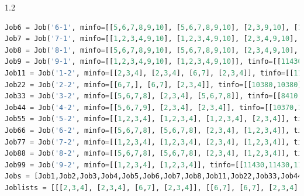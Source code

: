\documentclass{whutmod}
\begin{document}
\begin{spacing}{1.2}
\begin{lstlisting}[language=python]
Job6 = Job('6-1', minfo=[[5,6,7,8,9,10], [5,6,7,8,9,10], [2,3,9,10], [1,2,3,4,9,10]], tinfo=[[6480,6480,6480,6480,6480,6480], [5735,5735,5735,5735,5735,5735], [10585,10585,10585,10585], [4125,4125,4125,4125,4125,4125]], productType='F')
Job7 = Job('7-1', minfo=[[1,2,3,4,9,10], [1,2,3,4,9,10], [2,3,4,9,10], [1,2,3,4,9,10]], tinfo=[[9405,9405,9405,9405,9405,9405], [11665,11665,11665,11665,11665,11655], [18910,18910,18910,18910,18910], [5375,5375,5375,5375,5355,5355]], productType='G')
Job8 = Job('8-1', minfo=[[5,6,7,8,9,10], [5,6,7,8,9,10], [2,3,4,9,10], [1,2,3,4,9,10]], tinfo=[[4975,4975,4975,4975,4975,4975], [4975,4975,4975,4975,4975,4975], [7395,7395,7395,7395,7396], [2875,2875,2875,2875,2875,2875]], productType='H')
Job9 = Job('9-1', minfo=[[1,2,3,4,9,10], [1,2,3,4,9,10]], tinfo=[[11430,11430,11430,11430,11430,11430], [9155,9155,9155,9155,9155,9155]], productType='I')
Job11 = Job('1-2', minfo=[[2,3,4], [2,3,4], [6,7], [2,3,4]], tinfo=[[11553,11553,11553], [5769,5769,5769], [4657,4657], [2616,2616,2616]], productType='A')
Job22 = Job('2-2', minfo=[[6,7,], [6,7], [2,3,4]], tinfo=[[10380,10380], [14910,14910], [4905,4905,4905]], productType='B')
Job33 = Job('3-2', minfo=[[5,6,7,8], [2,3,4], [5,6,7,8]], tinfo=[[8410,8410,8410,8410], [15855,15855,15855], [3902,3902,3902,3902]], productType='C')
Job44 = Job('4-2', minfo=[[5,6,7,9], [2,3,4], [2,3,4]], tinfo=[[10370,10370,10370,10370], [15000,15000,15000], [9386,9386,9386]], productType='D')
Job55 = Job('5-2', minfo=[[1,2,3,4], [1,2,3,4], [1,2,3,4], [2,3,4]], tinfo=[[11655,11655,11655,11655], [7043,7043,7043,7043], [14355,14355,14355,14355], [23410,23410,23410]], productType='E')
Job66 = Job('6-2', minfo=[[5,6,7,8], [5,6,7,8], [2,3,4], [1,2,3,4]], tinfo=[[6480,6480,6480,6480], [5735,5735,5735,5735], [10585,10585,10585], [4125,4125,4125,4125]], productType='F')
Job77 = Job('7-2', minfo=[[1,2,3,4], [1,2,3,4], [2,3,4], [1,2,3,4]], tinfo=[[9405,9405,9405,9405], [11665,11665,11665,11665], [18910,18910,18910], [5375,5375,5375,5375]], productType='G')
Job88 = Job('8-2', minfo=[[5,6,7,8], [5,6,7,8], [2,3,4], [1,2,3,4]], tinfo=[[4975,4975,4975,4975], [4975,4975,4975,4975], [7395,7395,7395], [2875,2875,2875,2875]], productType='H')
Job99 = Job('9-2', minfo=[[1,2,3,4], [1,2,3,4]], tinfo=[[11430,11430,11430,11430], [9155,9155,9155,9155]], productType='I')
Jobs = [Job1,Job2,Job3,Job4,Job5,Job6,Job7,Job8,Job11,Job22,Job33,Job44,Job55,Job66,Job77,Job88,Job99]
Joblists = [[[2,3,4], [2,3,4], [6,7], [2,3,4]], [[6,7], [6,7], [2,3,4], [1]], [[5,6,7,8], [2,3,4], [5,6,7,8], [1]], [[5,6,7], [2,3,4], [2,3,4], [1]], [[1,2,3,4], [1,2,3,4], [1,2,3,4], [2,3,4]], [[5,6,7,8], [5,6,7,8], [2,3,4], [1,2,3,4]], [[1,2,3,4], [1,2,3,4], [2,3,4], [1,2,3,4]], [[5,6,7,8], [5,6,7,8], [2,3,4], [1,2,3,4]], [[1,2,3,4], [1,2,3,4], [1], [1]]]

\end{lstlisting}
\end{spacing}
\end{document}
